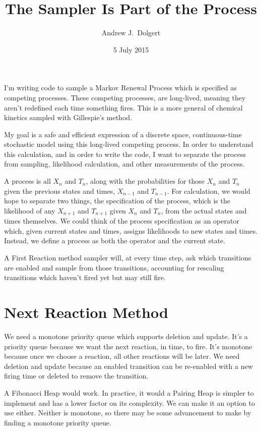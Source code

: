 \documentclass{article}
\title{The Sampler Is Part of the Process}
\author{Andrew J.\ Dolgert}
\date{5 July 2015}
\begin{document}
\maketitle

I'm writing code to sample a Markov Renewal Process
which is specified as competing processes. These competing
processes, are long-lived, meaning they aren't redefined
each time something fires. This is a more general
of chemical kinetics sampled with Gillespie's method.

My goal is a safe and efficient expression of a
discrete space, continuous-time stochastic model using
this long-lived competing process. In order to understand
this calculation, and in order to write the code,
I want to separate the process from sampling, likelihood
calculation, and other measurements of the process.

A process is all $X_n$ and $T_n$, along with the
probabilities for those $X_n$ and $T_n$ given the previous
states and times, $X_{n-1}$ and $T_{n-1}$.
For calculation, we would hope to separate two things,
the specification of the process, which is the likelihood
of any $X_{n+1}$ and $T_{n+1}$ given $X_n$ and $T_n$,
from the actual states and times themselves.
We could think of the process specification as an
operator which, given current states and times, 
assigns likelihoods to new states and times.
Instead, we define a process as both the operator
and the current state.


A First Reaction method sampler will, at every time
step, ask which transitions are enabled and sample
from those transitions, accounting for rescaling
transitions which haven't fired yet but may still fire.

\section{Next Reaction Method}
We need a monotone priority queue which supports
deletion and update. It's a priority queue because we want the
next reaction, in time, to fire. It's monotone because
once we choose a reaction, all other reactions will be later.
We need deletion and update because an enabled transition
can be re-enabled with a new firing time or deleted to
remove the transition.

A Fibonacci Heap would work. In practice, it would a Pairing Heap
is simpler to implement and has a lower factor on its complexity.
We can make it an option to use either. Neither is monotone,
so there may be some advancement to make by finding a monotone
priority queue.
\end{document}

